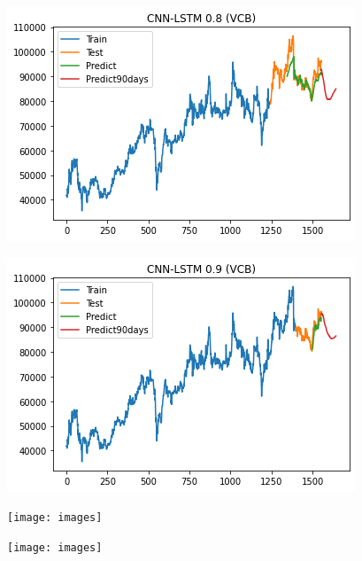 \documentclass[conference]{IEEEtran}
\begin{document}
\begin{minipage}{0.23\textwidth}
    \centering
    \includegraphics[width=\linewidth]{images/CNN-LSTM/CNNLSTM_VCB_90days_82.png}
    \label{fig:image1}
\end{minipage}
\hfill
\begin{minipage}{0.23\textwidth}
    \centering
    \includegraphics[width=\linewidth]{images/CNN-LSTM/CNNLSTM_VCB_90days_91.png}
    \label{fig:image2}
\end{minipage}

\begin{minipage}{0.23\textwidth}
    \centering
    \texttt{[image: images]}
    \label{fig:image1}
\end{minipage}
\hfill
\begin{minipage}{0.23\textwidth}
    \centering
    \texttt{[image: images]}
    \label{fig:image2}
\end{minipage}
\end{document}

